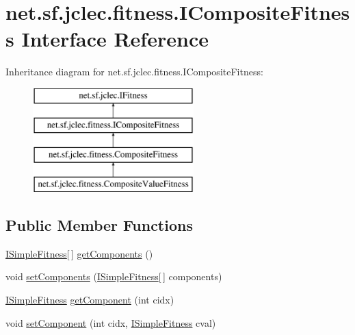 \hypertarget{interfacenet_1_1sf_1_1jclec_1_1fitness_1_1_i_composite_fitness}{\section{net.\-sf.\-jclec.\-fitness.\-I\-Composite\-Fitness Interface Reference}
\label{interfacenet_1_1sf_1_1jclec_1_1fitness_1_1_i_composite_fitness}
}
Inheritance diagram for net.\-sf.\-jclec.\-fitness.\-I\-Composite\-Fitness\-:\begin{figure}[H]
\begin{center}
\leavevmode
\includegraphics[height=4.000000cm]{interfacenet_1_1sf_1_1jclec_1_1fitness_1_1_i_composite_fitness}
\end{center}
\end{figure}
\subsection*{Public Member Functions}
\begin{DoxyCompactItemize}
\item 
\hyperlink{interfacenet_1_1sf_1_1jclec_1_1fitness_1_1_i_simple_fitness}{I\-Simple\-Fitness}\mbox{[}$\,$\mbox{]} \hyperlink{interfacenet_1_1sf_1_1jclec_1_1fitness_1_1_i_composite_fitness_aa5028f84af2e42e98747990a1818a3f5}{get\-Components} ()
\item 
void \hyperlink{interfacenet_1_1sf_1_1jclec_1_1fitness_1_1_i_composite_fitness_a4e0df445defe2719606810e62be2ef26}{set\-Components} (\hyperlink{interfacenet_1_1sf_1_1jclec_1_1fitness_1_1_i_simple_fitness}{I\-Simple\-Fitness}\mbox{[}$\,$\mbox{]} components)
\item 
\hyperlink{interfacenet_1_1sf_1_1jclec_1_1fitness_1_1_i_simple_fitness}{I\-Simple\-Fitness} \hyperlink{interfacenet_1_1sf_1_1jclec_1_1fitness_1_1_i_composite_fitness_a7a90bfd8df1d05ed16153e647a9f1d99}{get\-Component} (int cidx)
\item 
void \hyperlink{interfacenet_1_1sf_1_1jclec_1_1fitness_1_1_i_composite_fitness_a681e21343657e866148af83709ae85b8}{set\-Component} (int cidx, \hyperlink{interfacenet_1_1sf_1_1jclec_1_1fitness_1_1_i_simple_fitness}{I\-Simple\-Fitness} cval)
\end{DoxyCompactItemize}


